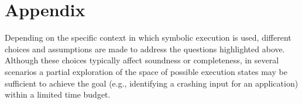 \documentclass[a4paper]{easychair}
\begin{document}
\iffalse
\section{Misc}
\label{se:misc}

The references list is condensed. The default bibliography styles, such as \texttt{plain}, \texttt{abbrv}, and \texttt{alpha}, are suggested.

Page numbers are at the bottom of every page. Authors must leave the page numbers in as-is. When EasyChair proceedings and Procedia volumes are processed by EasyChair, the correct volume page numbers will be inserted automatically.

Paragraph headings should not be capitalized and should have a trailing period. 

References must be provided in a {\tt .bib} file, so that \BibTeX\ can be used to generate the references in a consistent style in a volume. The preferred styles are {\tt plain} and {\tt alpha}.
\fi


%
%
%


\appendix
\section{Appendix}
\label{se:appendix}

\noindent Depending on the specific context in which symbolic execution is used, different choices and assumptions are made to address the questions highlighted above. Although these choices typically affect soundness or completeness, in several scenarios a partial exploration of the space of possible execution states may be sufficient to achieve the goal (e.g., identifying a crashing input for an application) within a limited time budget.


\end{document}
